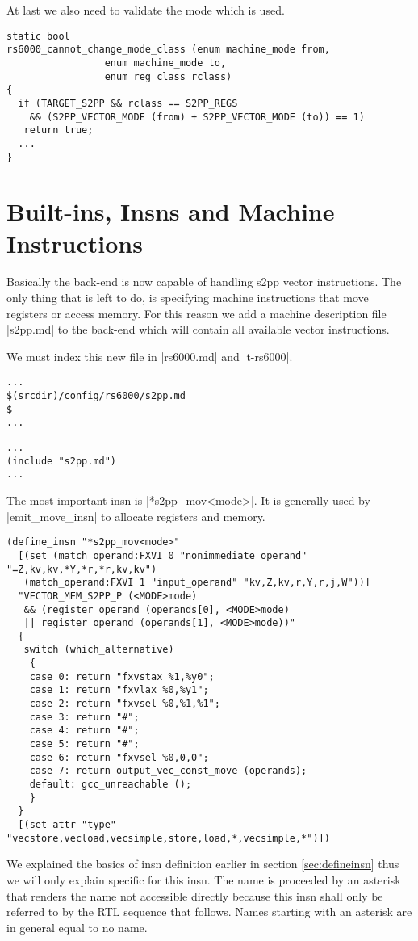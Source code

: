 At last we also need to validate the mode which is used.
\begin{lstlisting}
static bool
rs6000_cannot_change_mode_class (enum machine_mode from,
                 enum machine_mode to,
                 enum reg_class rclass)
{
  if (TARGET_S2PP && rclass == S2PP_REGS
    && (S2PP_VECTOR_MODE (from) + S2PP_VECTOR_MODE (to)) == 1)
   return true;
  ...
}
\end{lstlisting}

\section{Built-ins, Insns and Machine Instructions}
\label{sec:builtins}
Basically the back-end is now capable of handling s2pp vector instructions.
The only thing that is left to do, is specifying machine instructions that move registers or access memory.
For this reason we add a machine description file |s2pp.md| to the back-end which will contain all available vector instructions.

We must index this new file in |rs6000.md| and |t-rs6000|.
\begin{lstlisting}
...
$(srcdir)/config/rs6000/s2pp.md
$
...
\end{lstlisting}
\begin{lstlisting}
...
(include "s2pp.md")
...
\end{lstlisting}

The most important insn is |*s2pp_mov<mode>|.
It is generally used by |emit_move_insn| to allocate registers and memory.
\begin{lstlisting}
(define_insn "*s2pp_mov<mode>"
  [(set (match_operand:FXVI 0 "nonimmediate_operand" "=Z,kv,kv,*Y,*r,*r,kv,kv")
   (match_operand:FXVI 1 "input_operand" "kv,Z,kv,r,Y,r,j,W"))]
  "VECTOR_MEM_S2PP_P (<MODE>mode)
   && (register_operand (operands[0], <MODE>mode) 
   || register_operand (operands[1], <MODE>mode))"
  { 
   switch (which_alternative)
    {
    case 0: return "fxvstax %1,%y0";
    case 1: return "fxvlax %0,%y1";
    case 2: return "fxvsel %0,%1,%1";
    case 3: return "#";
    case 4: return "#";
    case 5: return "#";
    case 6: return "fxvsel %0,0,0";
    case 7: return output_vec_const_move (operands);
    default: gcc_unreachable ();
    }
  } 
  [(set_attr "type" "vecstore,vecload,vecsimple,store,load,*,vecsimple,*")])
\end{lstlisting}

We explained the basics of insn definition earlier in section \ref{sec:defineinsn} thus we will only explain specific for this insn.
The name is proceeded by an asterisk that renders the name not accessible directly because this insn shall only be referred to by the RTL sequence that follows.
Names starting with an asterisk are in general equal to no name.

